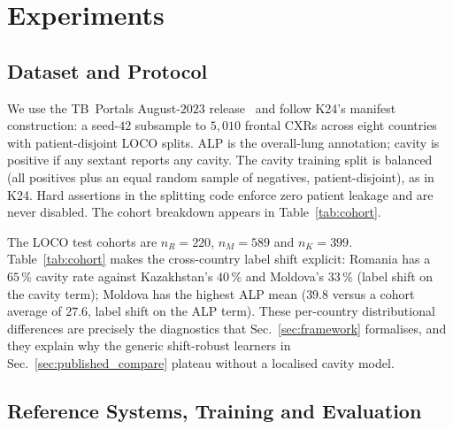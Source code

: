 \documentclass[runningheads]{llncs}
\begin{document}
\section{Experiments}

\subsection{Dataset and Protocol}
\label{sec:dataset}

We use the TB~Portals August-$2023$ release~\cite{tbportals2020} and follow K24's manifest construction: a seed-$42$ subsample to $5{,}010$ frontal CXRs across eight countries with patient-disjoint LOCO splits. ALP is the overall-lung annotation; cavity is positive if any sextant reports any cavity. The cavity training split is balanced (all positives plus an equal random sample of negatives, patient-disjoint), as in K24. Hard assertions in the splitting code enforce zero patient leakage and are never disabled. The cohort breakdown appears in Table~\ref{tab:cohort}.



The LOCO test cohorts are $n_R{=}220$, $n_M{=}589$ and $n_K{=}399$. Table~\ref{tab:cohort} makes the cross-country label shift explicit: Romania has a $65\,\%$ cavity rate against Kazakhstan's $40\,\%$ and Moldova's $33\,\%$ (label shift on the cavity term); Moldova has the highest ALP mean ($39.8$ versus a cohort average of $27.6$, label shift on the ALP term). These per-country distributional differences are precisely the diagnostics that Sec.~\ref{sec:framework} formalises, and they explain why the generic shift-robust learners in Sec.~\ref{sec:published_compare} plateau without a localised cavity model.

\subsection{Reference Systems, Training and Evaluation}
\end{document}
